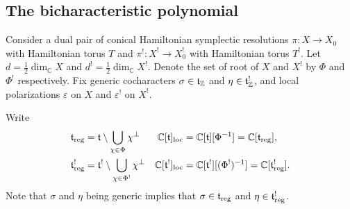 \subsection{The bicharacteristic polynomial}
\label{sec:bichar_poly}

Consider a dual pair of conical Hamiltonian symplectic resolutions $\pi : X \to X_0$ with Hamiltonian torus $T$ and $\pi^! : X^! \to X_0^!$ with Hamiltonian torus $T^!$. Let $d = \frac{1}{2} \dim_\mathbb{C} X$ and $d^! = \frac{1}{2} \dim_\mathbb{C} X^!$. Denote the set of root of $X$ and $X^!$ by $\Phi$ and $\Phi^!$ respectively. Fix generic cocharacters $\sigma \in \mathfrak{t}_\mathbb{Z}$ and $\eta \in \mathfrak{t}^!_\mathbb{Z}$, and local polarizations $\varepsilon$ on $X$ and $\varepsilon^!$ on $X^!$.

Write
\begin{align*}
    \mathfrak{t}_\mathrm{reg} &= \mathfrak{t} \setminus \bigcup_{\chi \in \Phi} \chi^\perp & \mathbb{C}[\mathfrak{t}]_{\mathrm{loc}} &= \mathbb{C}[\mathfrak{t}][\Phi^{-1}] = \mathbb{C}[\mathfrak{t}_\mathrm{reg}], \\
    \mathfrak{t}^!_\mathrm{reg} &= \mathfrak{t}^! \setminus \bigcup_{\chi \in \Phi^!} \chi^\perp & \mathbb{C}[\mathfrak{t}^!]_{\mathrm{loc}} &= \mathbb{C}[\mathfrak{t}^!][(\Phi^!)^{-1}] = \mathbb{C}[\mathfrak{t}^!_\mathrm{reg}].
\end{align*}
Note that $\sigma$ and $\eta$ being generic implies that $\sigma \in \mathfrak{t}_\mathrm{reg}$ and $\eta \in \mathfrak{t}^!_\mathrm{reg}$.

